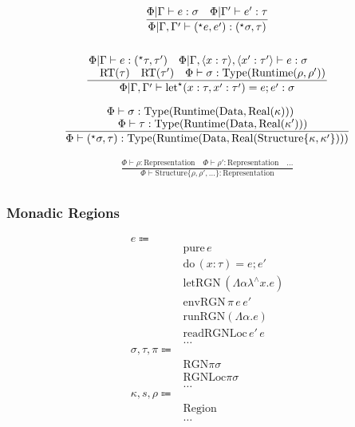 \documentclass {article}
\begin{document}
\begin{gather*}
\frac
{\Phi | \Gamma \vdash e : \sigma \quad \Phi | \Gamma' \vdash e' : \tau}
{\Phi | \Gamma, \Gamma' \vdash (^\star e, e') : (^\star \sigma, \tau) } \\
\\
\frac
{\splitfrac{\Phi | \Gamma \vdash e : (^\star \tau, \tau') \quad \Phi | \Gamma , \langle x : \tau \rangle, \langle x' : \tau' \rangle \vdash e : \sigma  }
{\text{RT}(\tau) \quad \text{RT}(\tau') \quad \Phi \vdash \sigma : \text{Type} (\text{Runtime} (\rho, \rho')) }}
{\Phi | \Gamma, \Gamma' \vdash \text{let}^\star (x : \tau, x' : \tau') = e; e' : \sigma}
\end{gather*}

\begin{gather*}
\frac
{\splitfrac{\Phi \vdash \sigma : \text{Type}(\text{Runtime}(\text{Data}, \text{Real}(\kappa)))}
{\Phi \vdash \tau : \text{Type} (\text{Runtime}(\text{Data}, \text{Real} (\kappa'))) }}
{\Phi \vdash (^\star \sigma, \tau) : \text{Type} (\text{Runtime} (\text{Data}, \text{Real} (\text{Structure} \{ \kappa,\kappa'\} )))} \\
\end{gather*}


\begin{gather*}
\frac
{\Phi \vdash \rho : \text{Representation} \quad \Phi \vdash \rho' : \text{Representation} \quad \dots}
{\Phi \vdash \text{Structure} \{ \rho, \rho', \dots \} : \text{Representation} } \\
\end{gather*}

\subsubsection{Monadic Regions}
\begin{align*}
e \Coloneqq & \\
& \text{pure} \, e \tag{Pure Region Transformer}\\
& \text{do} \, (x : \tau) = e; e' \tag{Bind Region Transformer} \\
& \text{letRGN} \, (\Lambda \alpha \lambda^\wedge x. e) \tag{Create Region} \\
& \text{envRGN} \, \pi \, e \, e' \tag{Subtype Region} \\
& \text{runRGN} (\Lambda \alpha. e) \tag{Evaluate Region} \\
& \text{readRGNLoc} \, e' \, e \tag{Dereference Pointer} \\
& \dots \\
\sigma, \tau, \pi \Coloneqq & \\
& \text{RGN} \pi \sigma \tag{Region Transformer} \\
& \text{RGNLoc} \pi \sigma \tag{Reference} \\
& \dots \\
\kappa, s, \rho \Coloneqq & \\
& \text{Region} \tag{Region} \\
& \dots
\end{align*}
\end{document}
